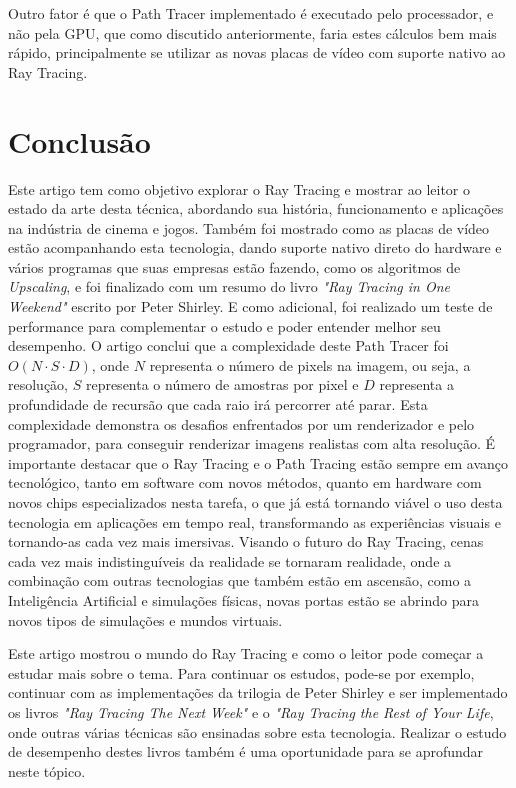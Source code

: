 \documentclass[journal]{IEEEtran}
\begin{document}
Outro fator é que o Path Tracer implementado é executado pelo processador, e não pela GPU, que como discutido anteriormente,
faria estes cálculos bem mais rápido, principalmente se utilizar as novas placas de vídeo com suporte nativo
ao Ray Tracing.

\section{Conclusão}
Este artigo tem como objetivo explorar o Ray Tracing e mostrar ao leitor o estado da arte desta técnica, abordando
sua história, funcionamento e aplicações na indústria de cinema e jogos. Também foi mostrado como as placas de vídeo
estão acompanhando esta tecnologia, dando suporte nativo direto do hardware e vários programas que suas empresas
estão fazendo, como os algoritmos de \emph{Upscaling}, e foi finalizado com um resumo do livro \emph{"Ray Tracing in
One Weekend"} escrito por Peter Shirley. E como adicional, foi realizado um teste de performance para complementar
o estudo e poder entender melhor seu desempenho. O artigo conclui que a complexidade deste Path Tracer foi 
$O(N \cdot S \cdot D)$, onde $N$ representa o número de pixels na imagem, ou seja, a resolução, $S$ representa o 
número de amostras por pixel e $D$ representa a profundidade de recursão que cada raio irá percorrer até parar.
Esta complexidade demonstra os desafios enfrentados por um renderizador e pelo programador, para conseguir
renderizar imagens realistas com alta resolução. É importante destacar que o Ray Tracing e o Path Tracing estão
sempre em avanço tecnológico, tanto em software com novos métodos, quanto em hardware com novos chips especializados
nesta tarefa, o que já está tornando viável o uso desta tecnologia em aplicações em tempo real, transformando
as experiências visuais e tornando-as cada vez mais imersivas. Visando o futuro do Ray Tracing, cenas cada
vez mais indistinguíveis da realidade se tornaram realidade, onde a combinação com outras tecnologias que também
estão em ascensão, como a Inteligência Artificial e simulações físicas, novas portas estão se abrindo para
novos tipos de simulações e mundos virtuais.

Este artigo mostrou o mundo do Ray Tracing e como o leitor pode começar a estudar mais sobre o tema. Para continuar
os estudos, pode-se por exemplo, continuar com as implementações da trilogia de Peter Shirley e ser implementado
os livros \emph{"Ray Tracing The Next Week"} e o \emph{"Ray Tracing the Rest of Your Life}, onde outras várias 
técnicas são ensinadas sobre esta tecnologia. Realizar o estudo de desempenho destes livros também é uma oportunidade
para se aprofundar neste tópico.




\end{document}
